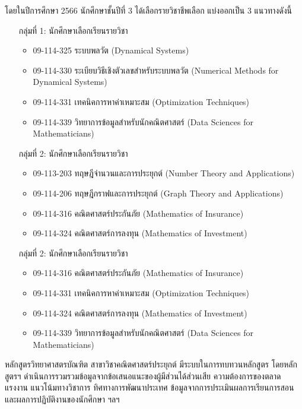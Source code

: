 โดยในปีการศึกษา 2566 นักศึกษาชั้นปีที่ 3 ได้เลือกรายวิชาชีพเลือก แบ่งออกเป็น 3 แนวทางดังนี้
\begin{enumerate}
	\item[กลุ่มที่ 1:] นักศึกษาเลือกเรียนรายวิชา
\begin{itemize}
	\item 09-114-325 ระบบพลวัต (Dynamical Systems)
	\item 09-114-330 ระเบียบวิธีเชิงตัวเลขสำหรับระบบพลวัต (Numerical Methods for Dynamical Systems)
	\item 09-114-331 เทคนิคการหาค่าเหมาะสม (Optimization Techniques)
	\item 09-114-339 วิทยาการข้อมูลสำหรับนักคณิตศาสตร์ (Data Sciences for Mathematicians)
\end{itemize}
\item[กลุ่มที่ 2:] นักศึกษาเลือกเรียนรายวิชา
\begin{itemize}
 \item 09-113-203 ทฤษฎีจำนวนและการประยุกต์ (Number Theory and Applications)
 \item 09-114-206 ทฤษฎีกราฟและการประยุกต์ (Graph Theory and Applications)
  \item 09-114-316 คณิตศาสตร์ประกันภัย (Mathematics of Insurance)
 \item 09-114-324 คณิตศาสตร์การลงทุน (Mathematics of Investment)
\end{itemize}
\item[กลุ่มที่ 2:] นักศึกษาเลือกเรียนรายวิชา
\begin{itemize}
	\item 09-114-316 คณิตศาสตร์ประกันภัย (Mathematics of Insurance)
	\item 09-114-331 เทคนิคการหาค่าเหมาะสม (Optimization Techniques)
	\item 09-114-324 คณิตศาสตร์การลงทุน (Mathematics of Investment)
	\item 09-114-339 วิทยาการข้อมูลสำหรับนักคณิตศาสตร์ (Data Sciences for Mathematicians)
\end{itemize}
\end{enumerate}

\begin{doclist}
\end{doclist}


หลักสูตรวิทยาศาสตรบัณฑิต สาขาวิชาคณิตศาสตร์ประยุกต์ มีระบบในการทบทวนหลักสูตร
โดยหลักสูตรฯ ดำเนินการรวมรวมข้อมูลจากข้อเสนอแนะของผู้มีส่วนได้ส่วนเสีย ความต้องการของตลาดแรงงาน แนวโน้มทางวิชาการ ทิศทางการพัฒนาประเทศ ข้อมูลจากการประเมินผลการเรียนการสอนและผลการปฏิบัติงานของนักศึกษา ฯลฯ 


